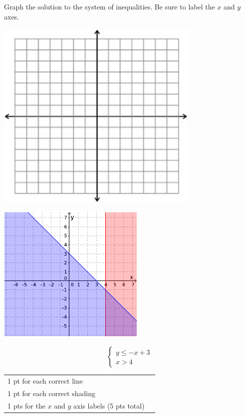 {
	Graph the solution to the system of inequalities. Be sure to label the $x$ and $y$ axes. \begin{onlyproblem}\begin{center}\includegraphics{fig-graphpaper.png}\end{center}\end{onlyproblem} \begin{onlysolution}\begin{center}\includegraphics{fig095-12-5-d-answer}\end{center}\end{onlysolution}
	$$\begin{cases}y\leq -x+3 \\ x>4 \end{cases}$$
}
{
	\begin{tabular}{l r}
	1 pt for each correct line\\
	1 pt for each correct shading\\
	1 pts for the $x$ and $y$ axis labels (5 pts total)\\
	\end{tabular}
}
